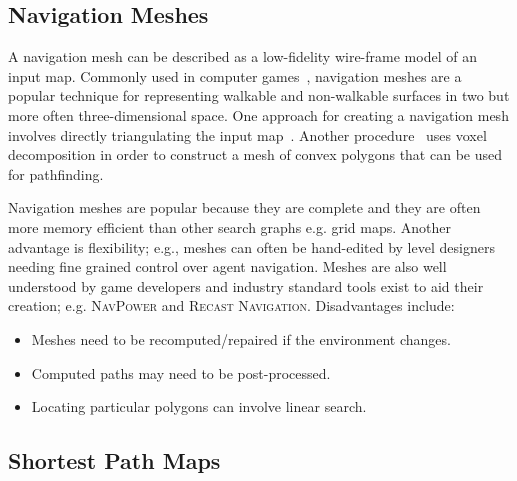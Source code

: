 \subsection{Navigation Meshes}
\label{cha::lit::graphs::nav}
A navigation mesh can be described as a low-fidelity wire-frame model of an input
map. Commonly used in computer games~\citep{snook00,tozour02}, navigation meshes are a
popular technique for representing walkable and non-walkable surfaces in two but
more often three-dimensional space.  One approach for creating a navigation mesh
involves directly triangulating the input map~\citep{demyen07,kallmann10}.  
Another procedure~\cite{mononen09} uses voxel decomposition in order to construct a 
mesh of convex polygons that can be used for pathfinding.

Navigation meshes are popular because they are complete and they are often more
memory efficient than other search graphs e.g. grid maps. Another advantage is
flexibility; e.g., meshes can often be hand-edited by level designers needing
fine grained control over agent navigation. Meshes are also well understood by 
game developers and industry standard tools exist to aid their creation; 
e.g. \textsc{NavPower} and \textsc{Recast Navigation}. Disadvantages include: 
\begin{itemize}
\item Meshes need to be recomputed/repaired if the environment changes.
\item Computed paths may need to be post-processed.
\item Locating particular polygons can involve linear search.
\end{itemize}

\subsection{Shortest Path Maps}
\label{cha::lit::graphs::spm}

